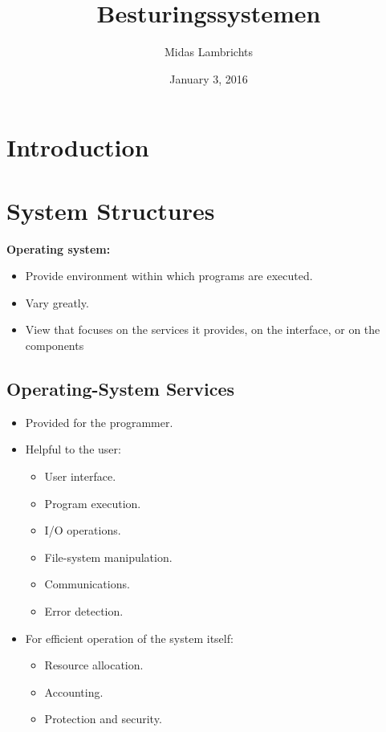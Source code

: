 \documentclass[10pt]{report}
\title{\Huge Besturingssystemen}
\date{January 3, 2016}
\author{Midas Lambrichts}
\begin{document}
\maketitle
\tableofcontents



\chapter{Introduction} \label{ch:Chapter1}


\chapter{System Structures} \label{ch:Chapter2}
	\textbf{Operating system:}
	\begin{itemize}
		\item Provide environment within which programs are executed.
		\item Vary greatly.
		\item View that focuses on the services it provides, on the interface, or on the components
	\end{itemize}

	\section{Operating-System Services}
		\begin{itemize}
			\item Provided for the programmer.
			\item Helpful to the user:
			\begin{itemize}
				\item User interface.
				\item Program execution.
				\item I/O operations.
				\item File-system manipulation.
				\item Communications.
				\item Error detection.
			\end{itemize}
			\item For efficient operation of the system itself:
			\begin{itemize}
				\item Resource allocation.
				\item Accounting.
				\item Protection and security.
			\end{itemize}
		\end{itemize}
\end{document}
